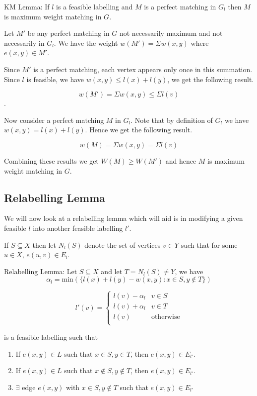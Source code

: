 \documentclass{article}
\begin{document}
KM Lemma: If $l$ is a feasible labelling and $M$ is a perfect matching in $G_l$ then $M$ is maximum weight matching in $G$.

Let $M'$ be any perfect matching in $G$ not necessarily maximum and not necessarily in $G_l$. We have the weight $w(M') = \Sigma w(x, y)$ where $e(x, y) \in M'$.

Since $M'$ is a perfect matching, each vertex appears only once in this summation. Since $l$ is feasible, we have $w(x, y) \leq l(x)+l(y)$, we get the following result.

$$w(M') = \Sigma w(x, y) \leq \Sigma l(v)$$.

Now consider a perfect matching $M$ in $G_l$. Note that by definition of $G_l$ we have $w(x, y) = l(x)+l(y)$. Hence we get the following result.

$$w(M) = \Sigma w(x, y) = \Sigma l(v)$$

Combining these results we get $W(M) \geq W(M')$ and hence $M$ is maximum weight matching in $G$.

\subsection{Relabelling Lemma}
We will now look at a relabelling lemma which will aid is in modifying a given feasible $l$ into another feasible labelling $l'$.

If $S \subseteq X$ then let $N_l(S)$ denote the set of vertices $v \in Y$ such that for some $u \in X$, $e(u, v) \in E_l$.

Relabelling Lemma: Let $S \subseteq X$ and let $T=N_l(S) \neq Y$, we have $$\alpha_l = \mathrm{min}(\{l(x)+l(y)-w(x, y) : x \in S, y \notin T\})$$

$$l'(v) = 
\begin{cases}
l(v)-\alpha_l & v \in S \\
l(v)+\alpha_l & v \in T \\
l(v) & \mathrm{otherwise} \\
\end{cases} $$ 

is a feasible labelling such that
\begin{enumerate}
    \item If $e(x, y) \in L$ such that $x \in S, y \in T$, then $e(x, y) \in E_{l'}$.
    \item If $e(x, y) \in L$ such that $x \notin S, y \notin T$, then $e(x, y) \in E_{l'}$.
    \item $\exists$ edge $e(x, y)$ with $x \in S, y \notin T$ such that $e(x, y) \in E_{l'}$ 
\end{enumerate}
\end{document}

